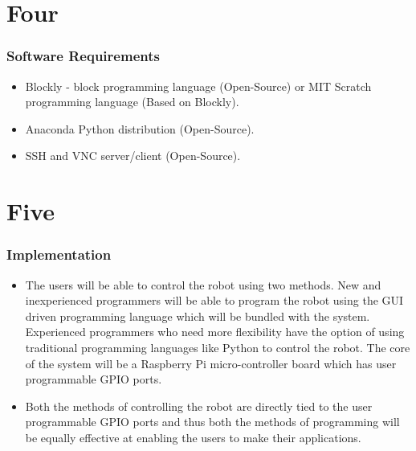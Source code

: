 \documentclass{beamer}
\begin{document}
\section{Four}  
\begin{frame}
\frametitle{Software Requirements}
\begin{center}
\justifying
\begin{itemize}
\item Blockly - block programming language (Open-Source) or MIT Scratch programming language (Based on Blockly).
\item Anaconda Python distribution (Open-Source).
\item SSH and VNC server/client (Open-Source).
\end{itemize}
\end{center}
\end{frame}  

\section{Five}  
\begin{frame}
\frametitle{Implementation}
\begin{center}
\justifying
\begin{itemize}
\item The users will be able to control the robot using two methods. New and inexperienced programmers will be able to program the robot using the GUI driven programming language which will be bundled with the system. Experienced programmers who need more flexibility have the option of using traditional programming languages like Python to control the robot. The core of the system will be a Raspberry Pi micro-controller board which has user programmable GPIO ports.

\item Both the methods of controlling the robot are directly tied to the user programmable GPIO ports and thus both the methods of programming will be equally effective at enabling the users to make their applications.
\end{itemize}
\end{center}
\end{frame}  
\end{document}
